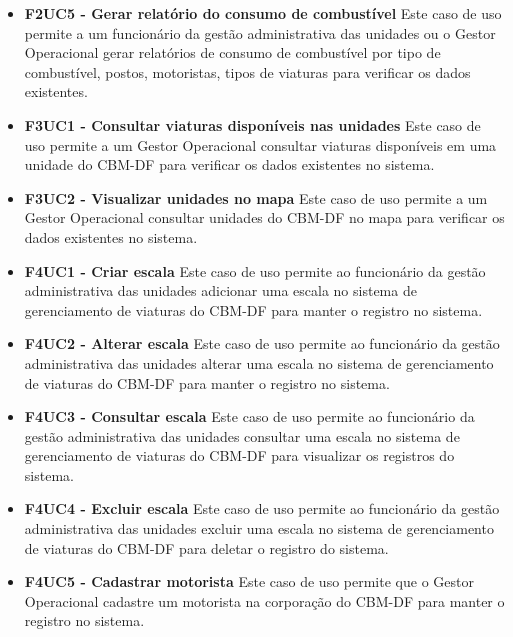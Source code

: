 \begin{itemize}
    \item \textbf{F2UC5 - Gerar relatório do consumo de combustível}
      \subitem
      Este caso de uso permite a um funcionário da gestão administrativa das unidades ou o Gestor Operacional gerar relatórios de
      consumo de combustível por tipo de combustível, postos, motoristas, tipos de viaturas para verificar os dados existentes. 

    \item \textbf{F3UC1 - Consultar viaturas disponíveis nas unidades}
      \subitem
      Este caso de uso permite a um Gestor Operacional consultar viaturas disponíveis em uma unidade do CBM-DF para verificar os 
      dados existentes no sistema.
  
    \item \textbf{F3UC2 - Visualizar unidades no mapa}
      \subitem
      Este caso de uso permite a um Gestor Operacional consultar unidades do CBM-DF no mapa para verificar os dados existentes no sistema.

    \item \textbf{F4UC1 - Criar escala}
      \subitem
      Este caso de uso permite ao funcionário da gestão administrativa das unidades adicionar uma escala no sistema de
      gerenciamento de viaturas do CBM-DF para manter o registro no sistema.

    \item \textbf{F4UC2 - Alterar escala}
      \subitem
      Este caso de uso permite ao funcionário da gestão administrativa das unidades alterar uma escala no sistema de
      gerenciamento de viaturas do CBM-DF para manter o registro no sistema.

    \item \textbf{F4UC3 - Consultar escala}
      \subitem
      Este caso de uso permite ao funcionário da gestão administrativa das unidades consultar uma escala no sistema 
      de gerenciamento de viaturas do CBM-DF para visualizar os registros do sistema.

    \item \textbf{F4UC4 - Excluir escala}
      \subitem
      Este caso de uso permite ao funcionário da gestão administrativa das unidades  excluir uma escala no sistema 
      de gerenciamento de viaturas do CBM-DF para deletar o registro do sistema.

    \item \textbf{F4UC5 - Cadastrar motorista}
      \subitem
      Este caso de uso permite que o Gestor Operacional cadastre um motorista na corporação do CBM-DF para manter o registro no sistema.


\end{itemize}

